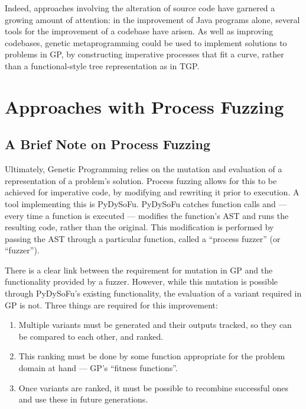 \documentclass[draft,12pt]{llncs}   %
\begin{document}
Indeed, approaches involving the alteration of source code have garnered a
growing amount of attention: in the improvement of Java programs alone, several
tools for the improvement of a codebase have
arisen\cite{cody2015locogp,arcuri2008multi,castle2012evolving}. As well as
improving codebases, genetic metaprogramming could be used to implement solutions to problems in GP, by constructing imperative
processes that fit a curve, rather than a functional-style tree representation
as in TGP\cite{koza1994genetic}.\par



\section{Approaches with Process Fuzzing}

\subsection{A Brief Note on Process Fuzzing}

Ultimately, Genetic Programming relies on the mutation and evaluation of a representation of a problem's solution. Process fuzzing allows for this to be achieved for imperative code, by modifying and rewriting it prior to execution. A tool implementing this is PyDySoFu\cite{pydysofu}. PyDySoFu catches function calls and --- every time a function is executed --- modifies the function's AST and runs the resulting code, rather than the original. This modification is performed by passing the AST through a particular function, called a ``process fuzzer'' (or ``fuzzer'').\par

There is a clear link between the requirement for mutation in GP and the functionality provided by a fuzzer. However, while this mutation is possible through PyDySoFu's existing functionality, the evaluation of a variant required in GP is not. Three things are required for this improvement:

\begin{enumerate}
\item Multiple variants must be generated and their outputs tracked, so they can be compared to each other, and ranked.
\item This ranking must be done by some function appropriate for the problem domain at hand --- GP's ``fitness functions''.
\item Once variants are ranked, it must be possible to recombine successful ones and use these in future generations.
\end{enumerate}
\end{document}

